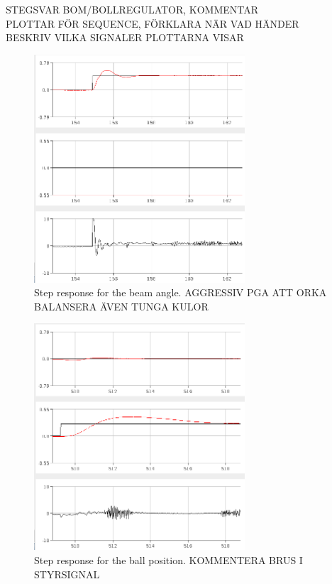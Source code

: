 STEGSVAR BOM/BOLLREGULATOR, KOMMENTAR \\
PLOTTAR FÖR SEQUENCE, FÖRKLARA NÄR VAD HÄNDER \\
BESKRIV VILKA SIGNALER PLOTTARNA VISAR \\

\begin{figure}[h]
\centering
\includegraphics[width=0.7\textwidth]{figures/stepresponsebeam-crop.png}
\caption{Step response for the beam angle. AGGRESSIV PGA ATT ORKA BALANSERA ÄVEN TUNGA KULOR}
\label{fig:stepresponsebeam}
\end{figure}

\begin{figure}[h]
\centering
\includegraphics[width=0.7\textwidth]{figures/stepresponseball1-crop.png}
\caption{Step response for the ball position. KOMMENTERA BRUS I STYRSIGNAL}
\label{fig:stepresponseball}
\end{figure}

